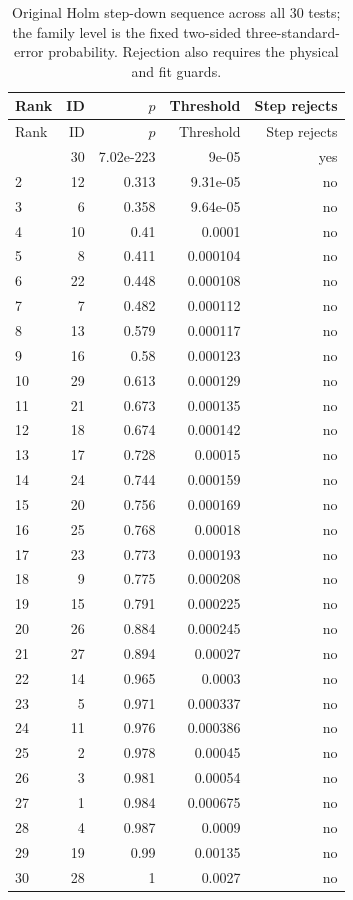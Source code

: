 {\small\setlength{\tabcolsep}{3.5pt}
\begin{longtable}{lrrrr}
\caption{Original Holm step-down sequence across all 30 tests; the family level is the fixed two-sided three-standard-error probability. Rejection also requires the physical and fit guards.}\\
\toprule
Rank & ID & $p$ & Threshold & Step rejects\\
\midrule
\endfirsthead
\toprule
Rank & ID & $p$ & Threshold & Step rejects\\
\midrule
\endhead
\bottomrule\endfoot
1 & 30 & 7.02e-223 & 9e-05 & yes\\
2 & 12 & 0.313 & 9.31e-05 & no\\
3 & 6 & 0.358 & 9.64e-05 & no\\
4 & 10 & 0.41 & 0.0001 & no\\
5 & 8 & 0.411 & 0.000104 & no\\
6 & 22 & 0.448 & 0.000108 & no\\
7 & 7 & 0.482 & 0.000112 & no\\
8 & 13 & 0.579 & 0.000117 & no\\
9 & 16 & 0.58 & 0.000123 & no\\
10 & 29 & 0.613 & 0.000129 & no\\
11 & 21 & 0.673 & 0.000135 & no\\
12 & 18 & 0.674 & 0.000142 & no\\
13 & 17 & 0.728 & 0.00015 & no\\
14 & 24 & 0.744 & 0.000159 & no\\
15 & 20 & 0.756 & 0.000169 & no\\
16 & 25 & 0.768 & 0.00018 & no\\
17 & 23 & 0.773 & 0.000193 & no\\
18 & 9 & 0.775 & 0.000208 & no\\
19 & 15 & 0.791 & 0.000225 & no\\
20 & 26 & 0.884 & 0.000245 & no\\
21 & 27 & 0.894 & 0.00027 & no\\
22 & 14 & 0.965 & 0.0003 & no\\
23 & 5 & 0.971 & 0.000337 & no\\
24 & 11 & 0.976 & 0.000386 & no\\
25 & 2 & 0.978 & 0.00045 & no\\
26 & 3 & 0.981 & 0.00054 & no\\
27 & 1 & 0.984 & 0.000675 & no\\
28 & 4 & 0.987 & 0.0009 & no\\
29 & 19 & 0.99 & 0.00135 & no\\
30 & 28 & 1 & 0.0027 & no\\
\end{longtable}}
